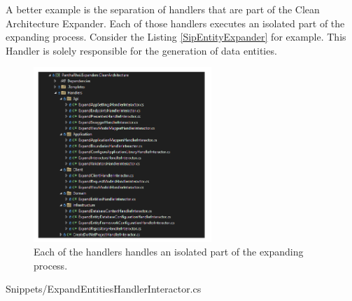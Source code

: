 A better example is the separation of handlers that are part of the Clean Architecture
Expander. Each of those handlers executes an isolated part of the expanding process.
Consider the Listing \ref{SipEntityExpander} 
\parencite{koks_expandentitieshandlerinteractor_2023} for example. This Handler is solely
responsible for the generation of data entities. 

\begin{figure}[H]
    \centering
    \includegraphics[width=0.6\textwidth]{Figures/expander_handlers.pdf}
    \caption[handlers]{Each of the handlers handles an isolated part of the expanding process.}
    \label{fig:handlers}
\end{figure}


    {Snippets/ExpandEntitiesHandlerInteractor.cs}